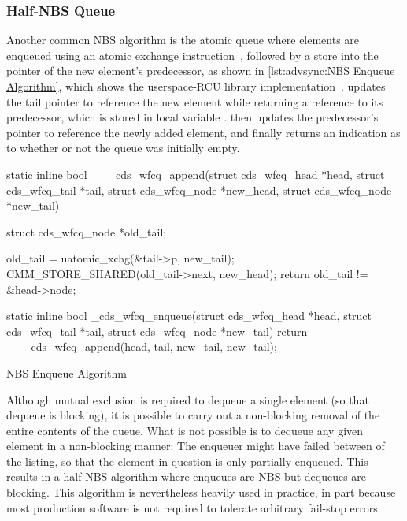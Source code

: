 \subsubsection{Half-NBS Queue}
\label{sec:advsync:Half-NBS Queue}

\begin{fcvref}
Another common NBS algorithm is the atomic queue where elements are
enqueued using an atomic exchange instruction~\cite{MagedMichael1993JPDC},
followed by a store into the  pointer of the new element's
predecessor, as shown in \cref{lst:advsync:NBS Enqueue Algorithm},
which shows the userspace-RCU library
implementation~\cite{MathieuDesnoyers2009URCU}.
 updates the tail pointer to reference the new element while
returning a reference to its predecessor, which is stored in
local variable .
 then updates the predecessor's  pointer to
reference the newly added element, and finally 
returns an indication as to whether or not the queue was initially
empty.

\begin{listing}
\begin{fcvlabel}
\begin{VerbatimL}[commandchars=\\\[\]]
static inline bool
___cds_wfcq_append(struct cds_wfcq_head *head,
                   struct cds_wfcq_tail *tail,
                   struct cds_wfcq_node *new_head,
                   struct cds_wfcq_node *new_tail)
{
	struct cds_wfcq_node *old_tail;

	old_tail = uatomic_xchg(&tail->p, new_tail);	\lnlbl[tail]
	CMM_STORE_SHARED(old_tail->next, new_head);     \lnlbl[pred]
	return old_tail != &head->node;			\lnlbl[ret]
}

static inline bool
_cds_wfcq_enqueue(struct cds_wfcq_head *head,
                  struct cds_wfcq_tail *tail,
                  struct cds_wfcq_node *new_tail)
{
	return ___cds_wfcq_append(head, tail,
	                          new_tail, new_tail);
}
\end{VerbatimL}
\end{fcvlabel}
\caption{NBS Enqueue Algorithm}
\label{lst:advsync:NBS Enqueue Algorithm}
\end{listing}

Although mutual exclusion is required to dequeue a single element
(so that dequeue is blocking), it is possible to carry out a non-blocking
removal of the entire contents of the queue.
What is not possible is to dequeue any given element in a non-blocking
manner:
The enqueuer might have failed between  of the
listing, so that the element in question is only partially enqueued.
This results in a half-NBS algorithm where enqueues are NBS but
dequeues are blocking.
This algorithm is nevertheless heavily used in practice, in part because
most production software is not required to tolerate arbitrary fail-stop
errors.
\end{fcvref}

